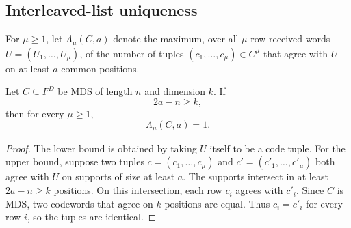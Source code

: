 
\subsection{Interleaved-list uniqueness}

For \(\mu\ge1\), let \(\Lambda_\mu(C,a)\) denote the maximum, over all
\(\mu\)-row received words \(U=(U_1,\ldots,U_\mu)\), of the number of tuples
\((c_1,\ldots,c_\mu)\in C^\mu\) that agree with \(U\) on at least \(a\) common
positions.

\begin{theorem}
\label{thm:interleaved-unique-high-agreement}
Let \(C\subseteq F^D\) be MDS of length \(n\) and dimension \(k\).  If
\[
  2a-n\ge k,
\]
then for every \(\mu\ge1\),
\[
  \Lambda_\mu(C,a)=1 .
\]
\end{theorem}

\begin{proof}
The lower bound is obtained by taking \(U\) itself to be a code tuple.  For the
upper bound, suppose two tuples \(c=(c_1,\ldots,c_\mu)\) and
\(c'=(c'_1,\ldots,c'_\mu)\) both agree with \(U\) on supports of size at least
\(a\).  The supports intersect in at least \(2a-n\ge k\) positions.  On this
intersection, each row \(c_i\) agrees with \(c'_i\).  Since \(C\) is MDS, two
codewords that agree on \(k\) positions are equal.  Thus \(c_i=c'_i\) for every
row \(i\), so the tuples are identical.
\end{proof}
